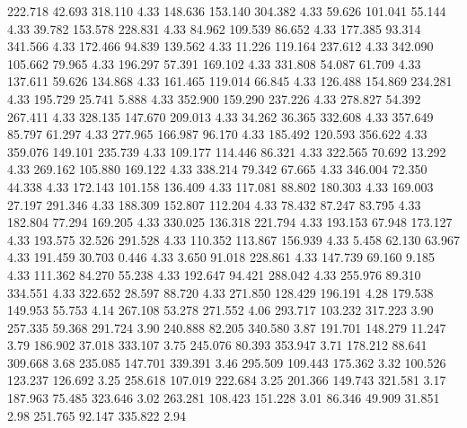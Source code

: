  222.718   42.693  318.110         4.33
 148.636  153.140  304.382         4.33
  59.626  101.041   55.144         4.33
  39.782  153.578  228.831         4.33
  84.962  109.539   86.652         4.33
 177.385   93.314  341.566         4.33
 172.466   94.839  139.562         4.33
  11.226  119.164  237.612         4.33
 342.090  105.662   79.965         4.33
 196.297   57.391  169.102         4.33
 331.808   54.087   61.709         4.33
 137.611   59.626  134.868         4.33
 161.465  119.014   66.845         4.33
 126.488  154.869  234.281         4.33
 195.729   25.741    5.888         4.33
 352.900  159.290  237.226         4.33
 278.827   54.392  267.411         4.33
 328.135  147.670  209.013         4.33
  34.262   36.365  332.608         4.33
 357.649   85.797   61.297         4.33
 277.965  166.987   96.170         4.33
 185.492  120.593  356.622         4.33
 359.076  149.101  235.739         4.33
 109.177  114.446   86.321         4.33
 322.565   70.692   13.292         4.33
 269.162  105.880  169.122         4.33
 338.214   79.342   67.665         4.33
 346.004   72.350   44.338         4.33
 172.143  101.158  136.409         4.33
 117.081   88.802  180.303         4.33
 169.003   27.197  291.346         4.33
 188.309  152.807  112.204         4.33
  78.432   87.247   83.795         4.33
 182.804   77.294  169.205         4.33
 330.025  136.318  221.794         4.33
 193.153   67.948  173.127         4.33
 193.575   32.526  291.528         4.33
 110.352  113.867  156.939         4.33
   5.458   62.130   63.967         4.33
 191.459   30.703    0.446         4.33
   3.650   91.018  228.861         4.33
 147.739   69.160    9.185         4.33
 111.362   84.270   55.238         4.33
 192.647   94.421  288.042         4.33
 255.976   89.310  334.551         4.33
 322.652   28.597   88.720         4.33
 271.850  128.429  196.191         4.28
 179.538  149.953   55.753         4.14
 267.108   53.278  271.552         4.06
 293.717  103.232  317.223         3.90
 257.335   59.368  291.724         3.90
 240.888   82.205  340.580         3.87
 191.701  148.279   11.247         3.79
 186.902   37.018  333.107         3.75
 245.076   80.393  353.947         3.71
 178.212   88.641  309.668         3.68
 235.085  147.701  339.391         3.46
 295.509  109.443  175.362         3.32
 100.526  123.237  126.692         3.25
 258.618  107.019  222.684         3.25
 201.366  149.743  321.581         3.17
 187.963   75.485  323.646         3.02
 263.281  108.423  151.228         3.01
  86.346   49.909   31.851         2.98
 251.765   92.147  335.822         2.94
